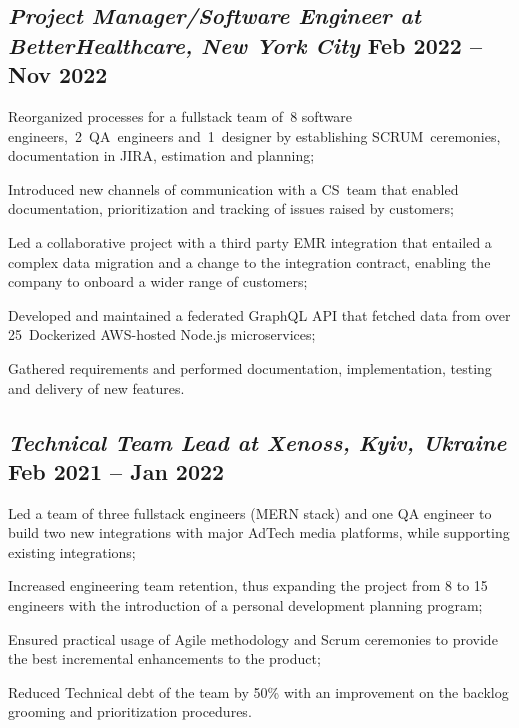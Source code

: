 \documentclass[a4paper,12pt]{book}
\begin{document}
\subsection{{\sl\bf\hspace{0.1in}Project Manager/Software Engineer at BetterHealthcare,  New York City } \hfill Feb 2022 -- Nov 2022}
\begin{zitemize}
\item Reorganized processes for a fullstack team of~8 software engineers,~2~QA~engineers and~1~designer by establishing SCRUM~ceremonies, documentation in JIRA, estimation and planning;
\item Introduced new channels of communication with a CS~team that enabled documentation, prioritization and tracking of issues raised by customers;
\item Led a collaborative project with a third party EMR integration that entailed a complex data migration and a change to the integration contract, enabling the company to onboard a wider range of customers;
\item Developed and maintained a federated GraphQL API that fetched data from over 25~Dockerized AWS-hosted Node.js microservices;
\item Gathered requirements and performed documentation, implementation, testing and delivery of new features.
\end{zitemize}

\subsection{{\sl\bf\hspace{0.1in}Technical Team Lead at Xenoss, Kyiv, Ukraine } \hfill Feb 2021 -- Jan 2022}
\begin{zitemize}
 \item Led a team of three fullstack engineers (MERN stack) and one QA engineer to build two new integrations with major AdTech media platforms, while supporting existing integrations;
 \item Increased engineering team retention, thus expanding the project from 8 to 15 engineers with the introduction of a personal development planning program;
 \item Ensured practical usage of Agile methodology and Scrum ceremonies to provide the best incremental enhancements to the product;
 \item Reduced Technical debt of the team by 50\% with an improvement on the backlog grooming and prioritization procedures.
\end{zitemize}
\end{document}
